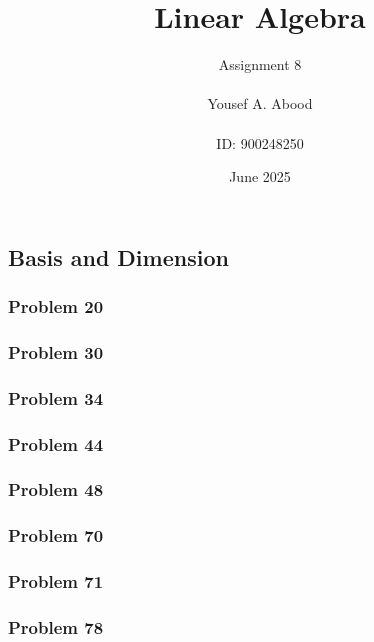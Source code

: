 \documentclass[a4paper,12pt]{article}
\title{Linear Algebra}
\author{Assignment 8\\ \\ Yousef A. Abood\\ \\ ID: 900248250}
\date{June 2025}
\begin{document}
\maketitle
\noindent\makebox[\linewidth]{\rule{15cm}{0.4pt}}

\subsection{Basis and Dimension}
\subsubsection*{Problem 20}
\subsubsection*{Problem 30}
\subsubsection*{Problem 34}
\subsubsection*{Problem 44}
\subsubsection*{Problem 48}
\subsubsection*{Problem 70}
\subsubsection*{Problem 71}
\subsubsection*{Problem 78}
\end{document}
